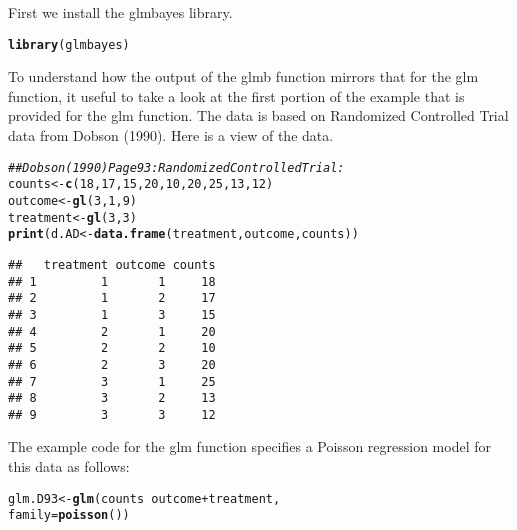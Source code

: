 \documentclass{article}\usepackage[]{graphicx}\usepackage[]{color}
\makeatletter
\newcommand{\hlnum}[1]{\textcolor[rgb]{0.686,0.059,0.569}{#1}}%
\newcommand{\hlcom}[1]{\textcolor[rgb]{0.678,0.584,0.686}{\textit{#1}}}%
\newcommand{\hlopt}[1]{\textcolor[rgb]{0,0,0}{#1}}%
\newcommand{\hlstd}[1]{\textcolor[rgb]{0.345,0.345,0.345}{#1}}%
\newcommand{\hlkwb}[1]{\textcolor[rgb]{0.69,0.353,0.396}{#1}}%
\newcommand{\hlkwc}[1]{\textcolor[rgb]{0.333,0.667,0.333}{#1}}%
\newcommand{\hlkwd}[1]{\textcolor[rgb]{0.737,0.353,0.396}{\textbf{#1}}}%
\newenvironment{kframe}{%
 \def\at@end@of@kframe{}%
 \ifinner\ifhmode%
  \def\at@end@of@kframe{\end{minipage}}%
  \begin{minipage}{\columnwidth}%
 \fi\fi%
 \def\FrameCommand##1{\hskip\@totalleftmargin \hskip-\fboxsep
 \colorbox{shadecolor}{##1}\hskip-\fboxsep
     \hskip-\linewidth \hskip-\@totalleftmargin \hskip\columnwidth}%
 \MakeFramed {\advance\hsize-\width
   \@totalleftmargin\z@ \linewidth\hsize
   \@setminipage}}%
 {\par\unskip\endMakeFramed%
 \at@end@of@kframe}
\newenvironment{knitrout}{}{} %
\makeatother
\begin{document}
First we install the glmbayes library.

\begin{knitrout}
\color{fgcolor}\begin{kframe}
\begin{alltt}
\hlkwd{library}\hlstd{(glmbayes)}
\end{alltt}
\end{kframe}
\end{knitrout}

To understand how the output of the glmb function mirrors that for the glm function, it useful to take a look at the first portion of the example that is provided for the glm function. The data is based on Randomized Controlled Trial data from Dobson (1990). Here is a view of the data.

\begin{knitrout}
\color{fgcolor}\begin{kframe}
\begin{alltt}
\hlcom{## Dobson (1990) Page 93: Randomized Controlled Trial :}
\hlstd{counts} \hlkwb{<-} \hlkwd{c}\hlstd{(}\hlnum{18}\hlstd{,}\hlnum{17}\hlstd{,}\hlnum{15}\hlstd{,}\hlnum{20}\hlstd{,}\hlnum{10}\hlstd{,}\hlnum{20}\hlstd{,}\hlnum{25}\hlstd{,}\hlnum{13}\hlstd{,}\hlnum{12}\hlstd{)}
\hlstd{outcome} \hlkwb{<-} \hlkwd{gl}\hlstd{(}\hlnum{3}\hlstd{,}\hlnum{1}\hlstd{,}\hlnum{9}\hlstd{)}
\hlstd{treatment} \hlkwb{<-} \hlkwd{gl}\hlstd{(}\hlnum{3}\hlstd{,}\hlnum{3}\hlstd{)}
\hlkwd{print}\hlstd{(d.AD} \hlkwb{<-} \hlkwd{data.frame}\hlstd{(treatment, outcome, counts))}
\end{alltt}
\begin{verbatim}
##   treatment outcome counts
## 1         1       1     18
## 2         1       2     17
## 3         1       3     15
## 4         2       1     20
## 5         2       2     10
## 6         2       3     20
## 7         3       1     25
## 8         3       2     13
## 9         3       3     12
\end{verbatim}
\end{kframe}
\end{knitrout}

The example code for the glm function specifies a Poisson regression model for this data as follows:

\begin{knitrout}
\color{fgcolor}\begin{kframe}
\begin{alltt}
\hlstd{glm.D93} \hlkwb{<-} \hlkwd{glm}\hlstd{(counts} \hlopt{~} \hlstd{outcome} \hlopt{+} \hlstd{treatment,}
              \hlkwc{family} \hlstd{=} \hlkwd{poisson}\hlstd{())}
\end{alltt}
\end{kframe}
\end{knitrout}
\end{document}
